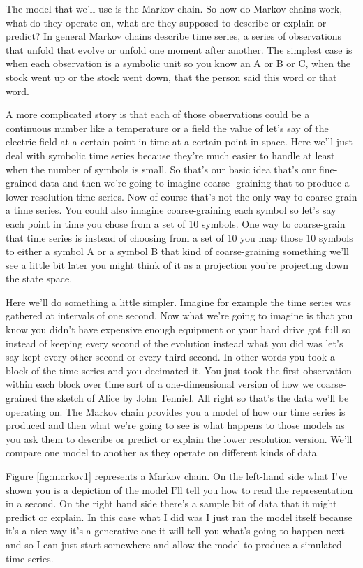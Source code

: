 \documentclass[]{article}
\begin{document}
The model that we'll use is the Markov
chain. So how do Markov chains work, what
do they operate on, what are they
supposed to describe or explain or
predict? In general Markov chains
describe time series, a series of
observations that unfold that
evolve or unfold one moment after
another. The simplest case is when each
observation is a symbolic unit so you
know an A or B or C, when the stock
went up or the stock went down, that the
person said this word or that word.

A more complicated story is that each of
those observations could be a continuous
number like a temperature or a field the
value of let's say of the electric field
at a certain point in time at a certain
point in space. Here we'll just deal with
symbolic time series because they're
much easier to handle at least when the
number of symbols is small. So that's our
basic idea that's our fine-grained data
and then we're going to imagine coarse-
graining that to produce a lower
resolution time series. Now of course
that's not the only way to coarse-grain
a time series. You could also imagine
coarse-graining each symbol so let's say
each point in time you chose from a set
of 10 symbols. One way to coarse-grain
that time series is instead of choosing
from a set of 10 you map those 10
symbols to either a symbol A or a symbol
B that kind of coarse-graining something
we'll see a little bit later you might
think of it as a projection you're
projecting down the state space.

Here we'll do something a little simpler.
Imagine for example the time series was
gathered at intervals of one second.
Now what we're going to imagine is that
you know you didn't have expensive
enough equipment or your hard drive got
full so instead of keeping every second
of the evolution instead what you did
was let's say kept every other second or
every third second. In other words you
took a block of the time series and you
decimated it. You just took the first
observation within each block over time
sort of a one-dimensional version of how
we coarse-grained the sketch of Alice by
John Tenniel. All right so that's the
data we'll be operating on. The Markov
chain provides you a model of how our
time series is produced and then what
we're going to see is what happens to
those models as you ask them to describe
or predict or explain
the lower resolution version. We'll
compare one model to another as they
operate on different kinds of data.

Figure \ref{fig:markov1} represents a Markov chain. On the left-hand
side what I've shown you is a depiction of the model I'll tell you how to read
the representation in a second. On the right hand side there's a sample bit of
data that it might predict or explain. In this case what I did was I just ran the
model itself because it's a nice way it's a generative one it will tell you what's
going to happen next and so I can just start somewhere and allow the model to
produce a simulated time series.
\end{document}
